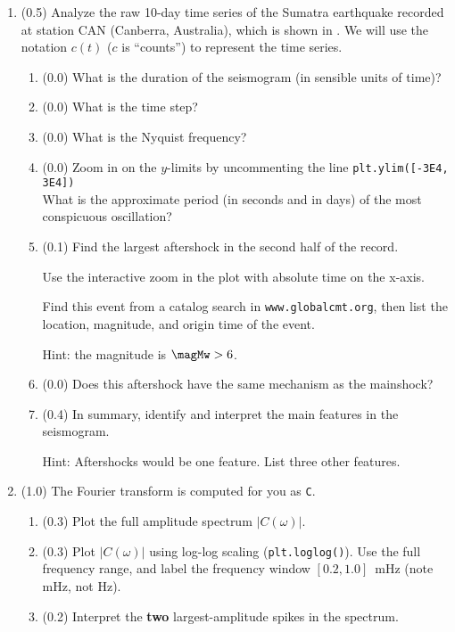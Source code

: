 \documentclass[11pt,titlepage,fleqn]{article}
\newcommand{\tfileresponse}{{\tt hw\_sumatraA\_CAN\_response.ipynb}}
\begin{document}
\begin{enumerate}



\item (0.5) Analyze the raw 10-day time series of the Sumatra earthquake recorded at station CAN (Canberra, Australia), which is shown in . We will use the notation $c(t)$ ($c$ is ``counts'') to represent the time series.

\begin{enumerate}
\item (0.0) What is the duration of the seismogram (in sensible units of time)?
\item (0.0) What is the time step?
\item (0.0) What is the Nyquist frequency?
\item (0.0) Zoom in on the $y$-limits by uncommenting the line \verb+plt.ylim([-3E4, 3E4])+ \\
What is the approximate period (in seconds and in days) of the most conspicuous oscillation?

\item (0.1) Find the largest aftershock in the second half of the record.

Use the interactive zoom in the plot with absolute time on the x-axis.

Find this event from a catalog search in \verb+www.globalcmt.org+, then list the location, magnitude, and origin time of the event.

Hint: the magnitude is $\magMw > 6$.

\item (0.0) Does this aftershock have the same mechanism as the mainshock?
\item (0.4) In summary, identify and interpret the main features in the seismogram.

Hint: Aftershocks would be one feature. List three other features.
\end{enumerate}


\item (1.0) The Fourier transform is computed for you as \verb+C+.
\begin{enumerate}
\item (0.3) Plot the full amplitude spectrum $|C(\omega)|$.
\item (0.3) Plot $|C(\omega)|$ using log-log scaling (\verb+plt.loglog()+). Use the full frequency range, and label the frequency window $[0.2,1.0]$~mHz (note mHz, not Hz).
\item (0.2) Interpret the {\bf two} largest-amplitude spikes in the spectrum.


\end{enumerate}
\end{enumerate}
\end{document}
